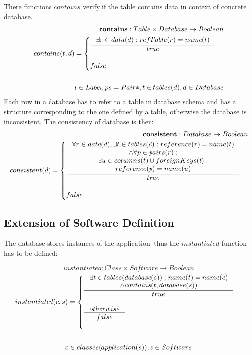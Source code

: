 \documentclass[11pt]{article}
\begin{document}
There functions $contains$ verify if the table contains data in context of concrete database.
\begin{align*}
	\mathbf{contains} : Table \times Database \rightarrow Boolean \\
	contains(t, d) = \begin{cases}
			\inference{\exists r \in data(d) : refTable(r) = name(t) }{true} \\ \\
		 	false
 		\end{cases} \\ \\
 l \in Label, ps = Pair*, t \in tables(d), d \in Database
\end{align*}
Each row in a database has to refer to a table in database schema and has a structure corresponding to the one defined by a table, otherwise the database is inconsistent. The consistency of database is then:
\begin{align*}
	\mathbf{consistent} : Database \rightarrow Boolean \\
	consistent(d) = \begin{cases}
 		\inference{\forall r \in data(d), \exists t \in tables(d) : reference(r) = name(t) \\ \wedge \forall p \in pairs(r) :\\ \exists u \in columns(t) \cup foreignKeys(t) : \\ reference(p) = name(u)}{true}
 	\\ \\
 	false
 \end{cases}
\end{align*}
 





\subsection{Extension of Software Definition}
The database stores instances of the application, thus the $instantiated$ function has to be defined:

$$instantiated : Class \times Software \rightarrow Boolean $$ 
\begin{equation*}
\begin{gathered}
	instantiated(c, s) = \begin{cases}
 \inference{\exists t \in tables(database(s)) : name(t) = name(c) \\ \wedge contains(t, database(s))}{true} \\ \\
  \inference{otherwise}{false} \\ \\
 \end{cases} \\ \\
 c \in classes(application(s)), s \in Software 
\end{gathered}
\end{equation*}
\end{document}
